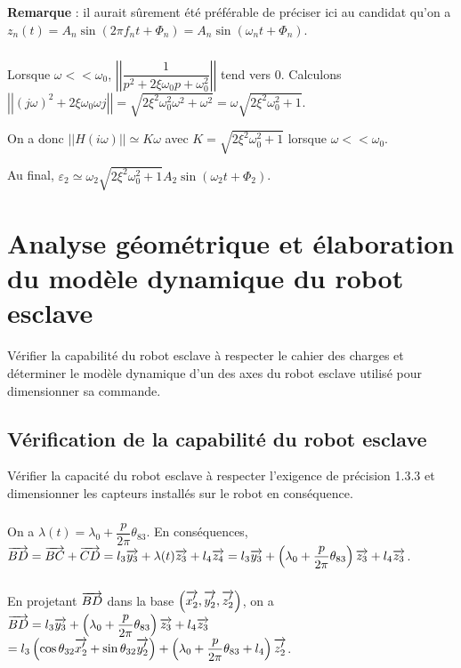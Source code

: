 \documentclass[10pt,fleqn]{article} %
\begin{document}
\textbf{Remarque }: il aurait sûrement été préférable de préciser ici au candidat qu'on a $z_n(t)=A_n\sin \left(2\pi f_n t + \Phi_n \right)=A_n\sin \left(\omega_n t + \Phi_n \right)$. 


\subparagraph{}	
Lorsque $\omega << \omega_0$, $\left|\left|  \dfrac{1}{p^2+2\xi\omega_0 p + \omega_0^2} \right|\right|$ tend vers 0. Calculons $\left|\left|  \left( j \omega \right) ^2+2\xi\omega_0  \omega j  \right|\right| =\sqrt{2\xi^2\omega_0^2 \omega^2 + \omega^2} =\omega \sqrt{2\xi^2\omega_0^2  + 1}$. 

On a donc $|| H\left( i\omega\right)|| \simeq K\omega $ avec $K=\sqrt{2\xi^2\omega_0^2  + 1}$ lorsque $\omega << \omega_0$.

Au final, $\varepsilon_2 \simeq \omega_2 \sqrt{2\xi^2\omega_0^2  + 1} A_2\sin \left(\omega_2 t + \Phi_2 \right) $.

\subparagraph{}	


\section{Analyse géométrique et élaboration du modèle dynamique du robot esclave}

\begin{obj}
Vérifier la capabilité du robot esclave à respecter le cahier des charges et déterminer le modèle dynamique
d’un des axes du robot esclave utilisé pour dimensionner sa commande.
\end{obj}

\subsection{Vérification de la capabilité du robot esclave}
\begin{obj}
Vérifier la capacité du robot esclave à respecter l’exigence de précision 1.3.3 et dimensionner les
capteurs installés sur le robot en conséquence.
\end{obj}


\subparagraph{}%
\subparagraph{}%
On a $\lambda(t)=\lambda_0 + \dfrac{p}{2\pi} \theta_{83}$. 
En conséquences, $\overrightarrow{BD}=\overrightarrow{BC}+\overrightarrow{CD}=l_3\overrightarrow{y_3}+\lambda(t)\overrightarrow{z_3}+l_4\overrightarrow{z_4}
=l_3\overrightarrow{y_3}+\left( \lambda_0 + \dfrac{p}{2\pi} \theta_{83} \right)\overrightarrow{z_3}+l_4\overrightarrow{z_3}$.


\subparagraph{}%
En projetant $\overrightarrow{BD}$ dans la base $\left(\overrightarrow{x_2'},\overrightarrow{y_2'},\overrightarrow{z_2'} \right)$, on a 
 $\overrightarrow{BD}=l_3\overrightarrow{y_3}+\left( \lambda_0 + \dfrac{p}{2\pi} \theta_{83} \right)\overrightarrow{z_3}+l_4\overrightarrow{z_3}$
 $ =l_3\left( \cos \theta_{32} \overrightarrow{x_2'} + \sin\theta_{32} \overrightarrow{y_2'}  \right)+\left( \lambda_0 + \dfrac{p}{2\pi} \theta_{83} +l_4\right)\overrightarrow{z_2'}$.
 
\end{document}
